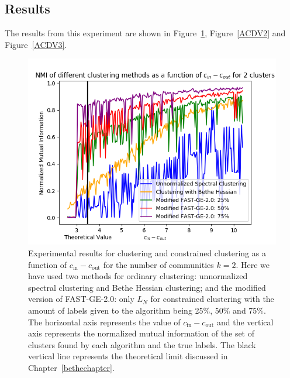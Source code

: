 \subsection*{Results}
The results from this experiment are shown in Figure~\ref{ACDV1}, Figure~\ref{ACDV2} and Figure~\vref{ACDV3}.

\begin{figure}[h]
\begin{center}
\includegraphics[width=14cm]{figures/ACDV1.png}
\end{center}
   \caption[Experimental results for clustering and constrained clustering as a function of $c_\text{in} - c_\text{out}$ for the number of communities $k=2$]{Experimental results for clustering and constrained clustering as a function of $c_\text{in} - c_\text{out}$ for the number of communities $k=2$. Here we have used two methods for ordinary clustering: unnormalized spectral clustering and Bethe Hessian clustering; and the modified version of FAST-GE-2.0: only $L_N$ for constrained clustering with the amount of labels given to the algorithm being 25\%, 50\% and 75\%. The horizontal axis represents the value of $c_\text{in} - c_\text{out}$ and the vertical axis represents the normalized mutual information of the set of clusters found by each algorithm and the true labels. The black vertical line represents the theoretical limit discussed in Chapter~\ref{bethechapter}.}
\label{ACDV1}
\end{figure}

